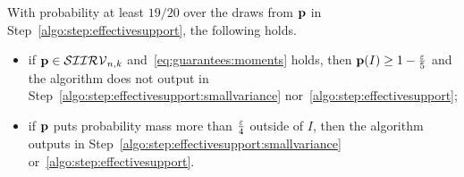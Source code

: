\begin{claim}\label{claim:estimate:effectivesupport}
  With probability at least $19/20$ over the draws from $\p$ in Step~\ref{algo:step:effectivesupport}, the following holds.
  \begin{itemize}
    \item if $\p\in\classksiirv[n]{k}$ and~\eqref{eq:guarantees:moments} holds, then $\p(I)\geq 1-\frac{\eps}{5}$ and the algorithm does not output \reject in Step~\ref{algo:step:effectivesupport:smallvariance} nor~\ref{algo:step:effectivesupport};
    \item if $\p$ puts probability mass more than $\frac{\eps}{4}$ outside of $I$, then the algorithm outputs \reject in Step~\ref{algo:step:effectivesupport:smallvariance} or~\ref{algo:step:effectivesupport}.
  \end{itemize}
\end{claim}
